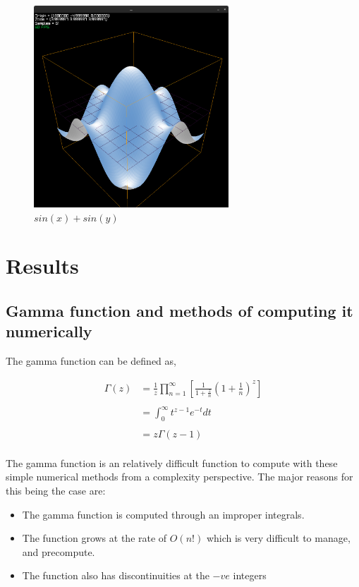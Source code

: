 \documentclass[12pt]{article}
\begin{document}
\begin{figure}
	\centering
	\includegraphics[width=0.65\textwidth]{example2.png}
	\caption{$sin(x) + sin(y)$}
	\label{fig:example2}
\end{figure}

\pagebreak
\section{Results}
\subsection{Gamma function and methods of computing it numerically} 

The gamma function can be defined as,

\begin{align*}
	\Gamma(z) &= \frac{1}{z} \prod_{n = 1}^{\infty} \left[ \frac{1}{1 + \frac{z}{n}} \left(1 + \frac{1}{n} \right)^{z} \right]\\
	\\
	&= \int_0^\infty t^{z-1} e^{-t} dt\\
	\\
	&= z \Gamma(z - 1)
\end{align*}
\\
The gamma function is an relatively difficult function to compute with these simple numerical methods from
a complexity perspective. The major reasons for this being the case are:
\begin{itemize}
	\item The gamma function is computed through an improper integrals.
	\item The function grows at the rate of $O(n!)$ which is very difficult to manage, and precompute.
	\item The function also has discontinuities at the $-ve$ integers
\end{itemize}
\end{document}
